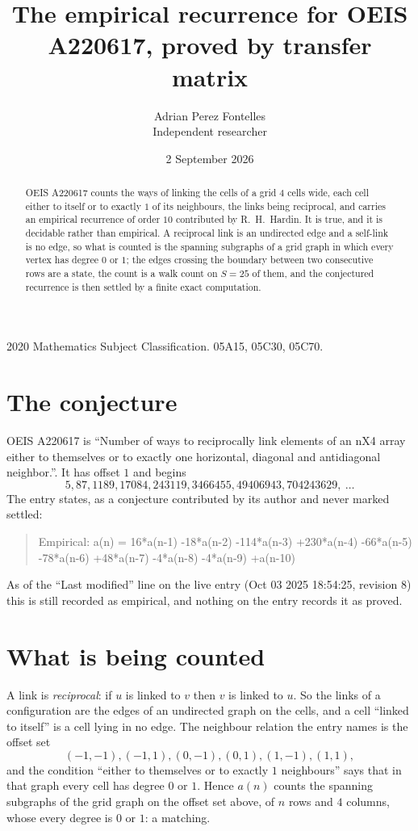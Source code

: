 \documentclass[11pt,a4paper]{article}
\title{The empirical recurrence for OEIS A220617, proved by transfer matrix}
\author{Adrian Perez Fontelles\\ \small Independent researcher}
\date{2 September 2026}
\theoremstyle{plain}
\theoremstyle{definition}
\begin{document}
\maketitle

\begin{abstract}
OEIS A220617 counts the ways of linking the cells of a grid $4$ cells wide, each cell either to
itself or to exactly $1$ of its neighbours, the links being reciprocal, and carries an
empirical recurrence of order $10$ contributed by R.~H.~Hardin. It is true, and it is
decidable rather than empirical. A reciprocal link is an undirected edge and a self-link is
no edge, so what is counted is the spanning subgraphs of a grid graph in which every vertex
has degree $0$ or $1$; the edges crossing the boundary between two consecutive rows are a
state, the count is a walk count on $S=25$ of them, and the conjectured recurrence is then
settled by a finite exact computation.
\end{abstract}

\noindent\small 2020 Mathematics Subject Classification. 05A15, 05C30, 05C70.\normalsize

\section{The conjecture}

OEIS A220617 is ``Number of ways to reciprocally link elements of an nX4 array either to themselves or to exactly one horizontal, diagonal and antidiagonal neighbor.''. It has offset $1$ and begins
\[
5, 87, 1189, 17084, 243119, 3466455, 49406943, 704243629,\ \dots
\]
The entry states, as a conjecture contributed by its author and never marked settled:
\begin{quote}
Empirical: a(n) = 16*a(n-1) -18*a(n-2) -114*a(n-3) +230*a(n-4) -66*a(n-5) -78*a(n-6) +48*a(n-7) -4*a(n-8) -4*a(n-9) +a(n-10)
\end{quote}
As of the ``Last modified'' line on the live entry (Oct 03 2025 18:54:25, revision 8) this is still
recorded as empirical, and nothing on the entry records it as proved.

\section{What is being counted}

A link is \emph{reciprocal}: if $u$ is linked to $v$ then $v$ is linked to $u$. So the links
of a configuration are the edges of an undirected graph on the cells, and a cell ``linked to
itself'' is a cell lying in no edge. The neighbour relation the entry names is the offset set
\[
(-1,-1), (-1,1), (0,-1), (0,1), (1,-1), (1,1),
\]
and the condition ``either to themselves or to exactly $1$ neighbours'' says that in that
graph every cell has degree $0$ or $1$. Hence $a(n)$ counts the spanning subgraphs of the
grid graph on the offset set above, of $n$ rows and $4$ columns,
whose every degree is $0$ or $1$: a matching.
\end{document}
